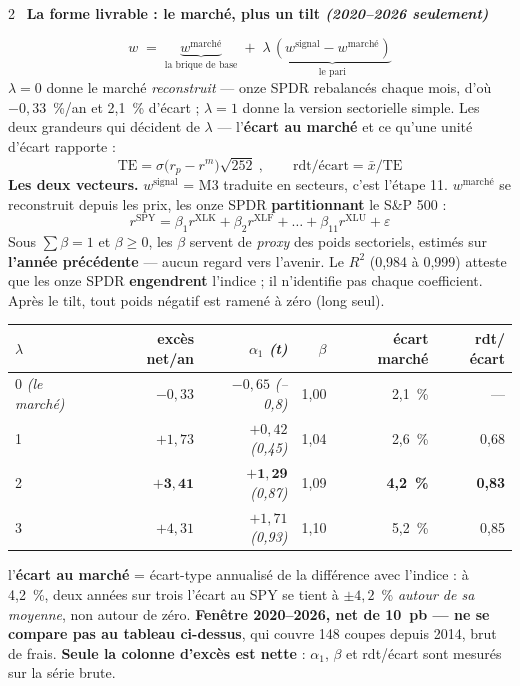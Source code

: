 \documentclass[9pt,a4paper]{extarticle}
\newcommand{\etape}[2]{\vspace{0.9mm}{\color{rouge}\bfseries #1.}~{\bfseries #2}\par\vspace{0.15mm}}
\begin{document}
\begin{multicols}{2}
\etape{13}{La forme livrable : le marché, plus un tilt \emph{(2020--2026 seulement)}}
\[ w \;=\; \underbrace{w^{\text{marché}}}_{\text{la brique de base}} \;+\; \lambda\,\underbrace{(w^{\text{signal}} - w^{\text{marché}})}_{\text{le pari}} \]
$\lambda = 0$ donne le marché \emph{reconstruit} --- onze SPDR rebalancés chaque mois, d'où $-0{,}33$~\%/an
et 2,1~\% d'écart ; $\lambda = 1$ donne la version sectorielle simple. Les deux grandeurs qui décident
de $\lambda$ --- l'\textbf{écart au marché} et ce qu'une unité d'écart rapporte :
\[ \mathrm{TE} = \sigma\bigl(r_p - r^{m}\bigr)\sqrt{252} \ , \qquad
   \text{rdt/écart} = \bar x \big/ \mathrm{TE} \]
\textbf{Les deux vecteurs.} $w^{\text{signal}}$ = M3 traduite en secteurs, c'est l'étape 11.
$w^{\text{marché}}$ se reconstruit depuis les prix, les onze SPDR \textbf{partitionnant} le S\&P 500 :
\[ r^{\text{SPY}} = \beta_1 r^{\text{XLK}} + \beta_2 r^{\text{XLF}} + \dots + \beta_{11} r^{\text{XLU}}
   + \varepsilon \]
Sous $\sum \beta = 1$ et $\beta \ge 0$, les $\beta$ servent de \emph{proxy} des poids sectoriels, estimés sur
\textbf{l'année précédente} --- aucun regard vers l'avenir. Le $R^2$ (0,984 à 0,999) atteste que les onze
SPDR \textbf{engendrent} l'indice ; il n'identifie pas chaque coefficient. Après le tilt, tout poids
négatif est ramené à zéro (long seul).

{\centering\scriptsize\setlength{\tabcolsep}{2.5pt}
\begin{tabular}{@{}l r r r r r@{}}
\toprule
$\lambda$ & excès \textbf{net}/an & $\alpha_1$ \emph{(t)} & $\beta$ & \textbf{écart marché} & rdt/écart \\
\midrule
0 \emph{(le marché)} & $-0{,}33$ & $-0{,}65$ \emph{(--0,8)} & 1,00 & 2,1~\% & --- \\
1 & $+1{,}73$ & $+0{,}42$ \emph{(0,45)} & 1,04 & 2,6~\% & 0,68 \\
2 & $\mathbf{+3{,}41}$ & $\mathbf{+1{,}29}$ \emph{(0,87)} & 1,09 & \textbf{4,2~\%} & \textbf{0,83} \\
3 & $+4{,}31$ & $+1{,}71$ \emph{(0,93)} & 1,10 & 5,2~\% & 0,85 \\
\bottomrule
\end{tabular}\par}
\vspace{0.2mm}
{\scriptsize\color{grisf} l'\textbf{écart au marché} = écart-type annualisé de la différence avec l'indice : à
4,2~\%, deux années sur trois l'écart au SPY se tient à $\pm 4{,}2$~\% \emph{autour de sa moyenne}, non autour de zéro. \textbf{Fenêtre 2020--2026,
net de 10~pb --- ne se compare pas au tableau ci-dessus}, qui couvre 148 coupes depuis 2014, brut de frais.
\textbf{Seule la colonne d'excès est nette} : $\alpha_1$, $\beta$ et rdt/écart sont mesurés sur la série brute.}\par
\vspace{0.5mm}


\end{multicols}
\end{document}

